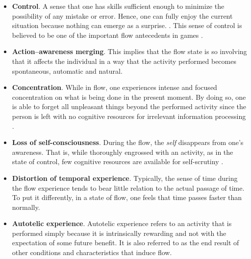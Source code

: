 \begin{itemize}
\item \textbf{Control}. A sense that one has skills sufficient enough to minimize the possibility of any mistake or error. Hence, one can fully enjoy the current situation because nothing can emerge as a surprise.
\cite{csikszentmihalyi2014flow}. This sense of control is believed to be one of the important flow antecedents in games \cite{kiili2006evaluations}. 
\item \textbf{Action–awareness merging}. This implies that the flow state is so involving that it affects the individual in a way that the activity performed becomes spontaneous, automatic and natural.
\item \textbf{Concentration}. While in flow, one experiences intense and focused concentration on what is being done in the present moment. By doing so, one is able to forget all unpleasant things beyond the performed activity since the person is left with no cognitive resources for irrelevant information processing \cite{kiili2006evaluations}. 
\item \textbf{Loss of self-consciousness}. During the flow, the \textit{self} disappears from one's awareness. That is, while thoroughly engrossed with an activity, as in the state of control, few cognitive resources are
available for self-scrutiny \cite{kiili2006evaluations}.
\item \textbf{Distortion of temporal experience}. Typically, the sense of time
during the flow experience tends to bear little relation to the actual passage of time. To put it differently, in a state of flow, one feels that time passes faster than normally.
\item \textbf{Autotelic experience}. Autotelic experience refers to an activity that is performed simply because it is intrinsically rewarding and not with the expectation of some future benefit. It is also referred to as the end result of other conditions and characteristics that induce flow. 
\end{itemize}
